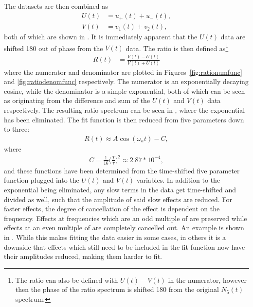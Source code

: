The datasets are then combined as 
    \begin{equation}
    \begin{aligned}
        U(t) &= u_{+}(t) + u_{-}(t), \\
        V(t) &= v_{1}(t) + v_{2}(t),
    \label{eq:UandV}
    \end{aligned}
    \end{equation}
both of which are shown in . It is immediately apparent that the $U(t)$ data are shifted 180\textdegree{} out of phase from the $V(t)$ data. The ratio is then defined as\footnote{The ratio can also be defined with $U(t) - V(t)$ in the numerator, however then the phase of the ratio spectrum is shifted 180\textdegree{} from the original $N_{5}(t)$ spectrum.}
    \begin{align}
        R(t) &= \frac{V(t) - U(t)}{V(t) + U(t)}
    \label{eq:ratioUV}
    \end{align}
where the numerator and denominator are plotted in Figures~\ref{fig:rationumfunc} and \ref{fig:ratiodenomfunc} respectively. The numerator is an exponentially decaying cosine, while the denominator is a simple exponential, both of which can be seen as originating from the difference and sum of the $U(t)$ and $V(t)$ data respectively. The resulting ratio spectrum can be seen in , where the exponential has been eliminated. The fit function is then reduced from five parameters down to three:
    \begin{align}
        R(t) \approx A \cos(\omega_{a}t) - C,
    \label{eq:ratiowithC}
    \end{align}
where  
    \begin{align}
        C = \frac{1}{16} \Big(\frac{T}{\tau}\Big)^{2} \approx 2.87 * 10^{-4},
    \end{align}
and these functions have been determined from the time-shifted five parameter function plugged into the $U(t)$ and $V(t)$ variables. In addition to the exponential being eliminated, any slow terms in the data get time-shifted and divided as well, such that the amplitude of said slow effects are reduced. For faster effects, the degree of cancellation of the effect is dependent on the frequency. Effects at frequencies which are an odd multiple of \wa are preserved while effects at an even multiple of \wa are completely cancelled out. An example is shown in . While this makes fitting the data easier in some cases, in others it is a downside that effects which still need to be included in the fit function now have their amplitudes reduced, making them harder to fit.


